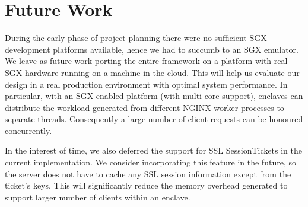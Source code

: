 \documentclass[../main.tex]{subfiles}
\begin{document}
\section{Future Work}
\label{sec:futurework}
During the early phase of project planning there were no sufficient SGX
development platforms available, hence we had to succumb to an SGX emulator. We
leave as future work porting the entire framework on a platform with real SGX
hardware running on a machine in the cloud. This will help us evaluate our
design in a real production environment with optimal system performance. In
particular, with an SGX enabled platform (with multi-core support), enclaves
can distribute the workload generated from different NGINX worker processes to
separate threads. Consequently a large number of client requests can be
honoured concurrently.

In the interest of time, we also deferred the support for SSL SessionTickets in
the current implementation. We consider incorporating this feature in the
future, so the server does not have to cache any SSL session information except
from the ticket's keys. This will significantly reduce the memory overhead
generated to support larger number of clients within an enclave.
\end{document}
